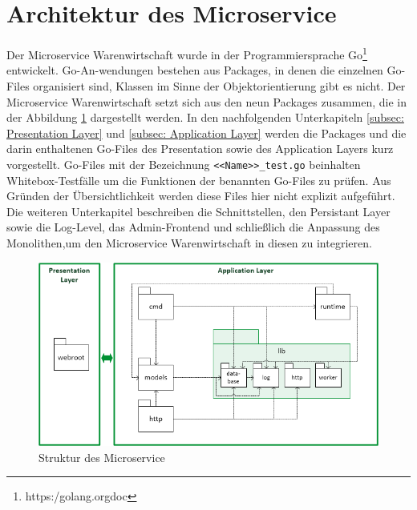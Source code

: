 \section{Architektur des Microservice}
\label{sec: Architektur des Microservice}
Der Microservice Warenwirtschaft wurde in der Programmiersprache Go\footnote{https:\//golang.org\/doc\/} entwickelt. Go-An-wendungen bestehen aus Packages, in denen die einzelnen Go-Files organisiert sind, Klassen im Sinne der Objektorientierung gibt es nicht. Der Microservice Warenwirtschaft setzt sich aus den neun Packages zusammen, die in der Abbildung \ref{pic:Struktur des Microservice} dargestellt werden. In den nachfolgenden Unterkapiteln \ref{subsec: Presentation Layer} und \ref{subsec: Application Layer} werden die Packages und die darin enthaltenen Go-Files des Presentation  sowie des Application Layers kurz vorgestellt. Go-Files mit der Bezeichnung \texttt{<<Name>>\_test.go} beinhalten Whitebox-Testfälle um die Funktionen der benannten Go-Files zu prüfen. Aus Gründen der Übersichtlichkeit werden diese Files hier nicht explizit aufgeführt. Die weiteren Unterkapitel beschreiben die Schnittstellen, den Persistant Layer sowie die Log-Level, das Admin-Frontend und schließlich die Anpassung des Monolithen,um den Microservice Warenwirtschaft in diesen zu integrieren. 

\begin{figure}[H]
	\centering
	\includegraphics[width=0.95 \textwidth]{./pics/struktur.png}
	\caption{Struktur des Microservice}
	\label{pic:Struktur des Microservice}
\end{figure}

\newpage
